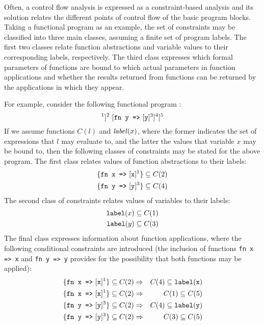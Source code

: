 \documentclass[10pt,a4paper,final,oneside,fleqn]{book}
\begin{document}
Often, a control flow analysis is expressed as a constraint-based analysis and its solution relates the different points of control flow of the basic program blocks.  Taking a functional program as an example, the set of constraints may be classified into three main classes, assuming a finite set of program labels.  The first two classes relate function abstractions and variable values to their corresponding labels, respectively.  The third class expresses which formal parameters of functions are bound to which actual parameters in function applications and whether the results returned from functions can be returned by the applications in which they appear.

For example, consider the following functional program \cite{nielson1}:
\begin{equation*}
[[\mbox{\texttt{fn x =>} }[\mbox{\texttt{x}}]^1]^2~[\mbox{\texttt{fn y =>} }[\mbox{\texttt{y}}]^3]^4]^5\end{equation*}
If we assume functions $C(l)$ and $\mbox{{\itshape label\/}}(x)$, where the former indicates the set of expressions that $l$ may evaluate to, and the latter the values that variable $x$ may be bound to, then the following classes of constraints may be stated for the above program. The first class relates values of function abstractions to their labels:
\begin{eqnarray*}
\{\mbox{\texttt{fn x =>} }[\mbox{\texttt{x}}]^1\}\subseteq C(2)\\
\{\mbox{\texttt{fn y =>} }[\mbox{\texttt{y}}]^3\}\subseteq C(4)
\end{eqnarray*}
The second class of constraints relates values of variables to their labels:
\begin{eqnarray*}
\mbox{\texttt{label}}(x)\subseteq C(1)\\
\mbox{\texttt{label}}(y)\subseteq C(3)
\end{eqnarray*}
The final class expresses information about function applications, where the following conditional constraints are introduced (the inclusion of functions \texttt{fn x => x} and \texttt{fn y => y} provides for the possibility that both functions may be applied):
\begin{eqnarray*}
\{\mbox{\texttt{fn x =>} }[\mbox{\texttt{x}}]^1\}\subseteq C(2)&\Rightarrow&C(4)\subseteq\mbox{\texttt{label}}(\mbox{\texttt{x}})\\
\{\mbox{\texttt{fn x =>} }[\mbox{\texttt{x}}]^1\}\subseteq C(2)&\Rightarrow&C(1)\subseteq C(5)\\
\{\mbox{\texttt{fn y =>} }[\mbox{\texttt{y}}]^3\}\subseteq C(2)&\Rightarrow&C(4)\subseteq\mbox{\texttt{label}}(\mbox{\texttt{y}})\\
\{\mbox{\texttt{fn y =>} }[\mbox{\texttt{y}}]^3\}\subseteq C(2)&\Rightarrow&C(3)\subseteq C(5)
\end{eqnarray*}
\end{document}
